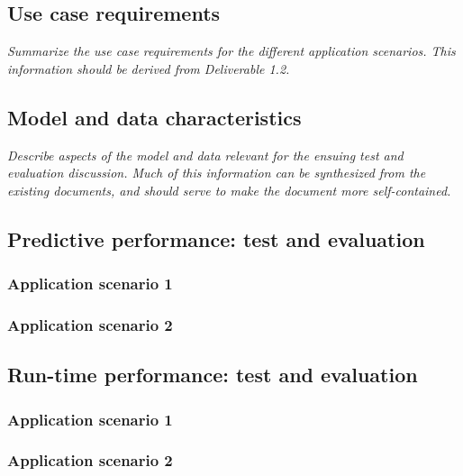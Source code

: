 \documentclass[11pt, oneside]{article}   	%
\numberwithin{figure}{section}
\numberwithin{equation}{section}
\numberwithin{table}{section}
\begin{document}
\subsection{Use case requirements}

\emph{Summarize the use case requirements for the different application scenarios. This information should be
  derived from Deliverable 1.2.}

\subsection{Model and data characteristics}

\emph{Describe aspects of the model and data relevant for the ensuing test and evaluation discussion. Much of
  this information can be synthesized from the existing documents, and should serve to make the document more
  self-contained. }




\subsection{Predictive performance: test and evaluation}

\subsubsection{Application scenario 1}

\subsubsection{Application scenario 2}

\subsection{Run-time performance: test and evaluation}

\subsubsection{Application scenario 1}

\subsubsection{Application scenario 2}
\end{document}
